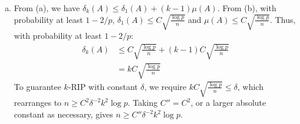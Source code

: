 \documentclass[11pt,a4paper,margin=1in]{article}
\begin{document}
\begin{enumerate}[(a)]
    product of independent Gaussians is sub-exponential. Thus, again with Bernstein's
    inequality, we have $P(|A_i^\top A_j| \geq t) \leq 2\exp(-cnt^2)$ for some 
    absolute constant $c > 0$ and $0 < t \leq 1$. There are $\binom{p}{2}$ distinct
    pairs of columns, thus applying the union bound gives:
    \begin{align*}
        P(\mu(A) \geq t) &= P\left(\max_{i,j=1,\ldots,p, i \neq j}|A_i^\top A_j| \geq t\right) \\
        &\leq \sum_{i,j=1,\ldots,p, i \neq j} P(|A_i^\top A_j| \geq t) \\
        &\leq 2\binom{p}{2}\exp(-cnt^2) \\
        &\leq p^2\exp(-cnt^2)
    \end{align*}
    Now we combine the two bounds:
    \begin{align*}
        P(\delta_1(A) \geq t \text{ or } \mu(A) \geq t) &\leq 2p\exp(-cnt^2) + p^2\exp(-cnt^2) \\
        &\leq 2p^2\exp(-cnt^2), \quad p \geq 2 
    \end{align*}
    Choose $t = C\sqrt{\frac{\log p}{n}}$ with $C = \sqrt{3/c}$. Then $cnt^2 = 3\log p$, and we have:
    \begin{align*}
        P(\delta_1(A) \geq C\sqrt{\frac{\log p}{n}} \text{ or } \mu(A) \geq C\sqrt{\frac{\log p}{n}}) &\leq 2p^2\exp(-3\log p) \\
        &= 2p^2p^{-3} = 2/p
    \end{align*}
    For $n \geq C'\log p$, with $C' \geq C^2$, we have $t \leq 1$, and thus with
    probability at least $1 - 2/p$, $\delta_1(A) \leq C\sqrt{\frac{\log p}{n}}$ and
    $\mu(A) \leq C\sqrt{\frac{\log p}{n}}$.
    \item From (a), we have $\delta_k(A) \leq \delta_1(A) + (k - 1)\mu(A)$. From (b), 
    with probability at least $1 - 2/p$, $\delta_1(A) \leq C\sqrt{\frac{\log p}{n}}$ and
    $\mu(A) \leq C\sqrt{\frac{\log p}{n}}$. Thus, with probability at least $1 - 2/p$:
    \begin{align*}
        \delta_k(A) &\leq C\sqrt{\frac{\log p}{n}} + (k - 1)C\sqrt{\frac{\log p}{n}} \\
        &= kC\sqrt{\frac{\log p}{n}}
    \end{align*}
    To guarantee $k$-RIP with constant $\delta$, we require $kC\sqrt{\frac{\log p}{n}} \leq \delta$, 
    which rearranges to $n \geq C^2\delta^{-2}k^2\log p$. Taking $C'' = C^2$, or
    a larger absolute constant as necessary, gives $n \geq C''\delta^{-2}k^2\log p$.

\end{enumerate}
\end{document}
